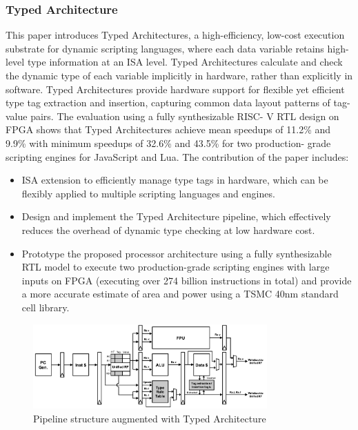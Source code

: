 \subsubsection{Typed Architecture}
This paper introduces Typed
Architectures\cite{TypedArchitecture}, a high-efficiency, low-cost execution substrate 
for dynamic scripting languages, where each data
variable retains high-level type information at an ISA level.
Typed Architectures calculate and check the dynamic type
of each variable implicitly in hardware, rather than explicitly
in software. Typed Architectures provide
hardware support for flexible yet efficient type tag extraction
and insertion, capturing common data layout patterns of tag-
value pairs. The evaluation using a fully synthesizable RISC-
V RTL design on FPGA shows that Typed Architectures
achieve mean speedups of 11.2\% and 9.9\% with
minimum speedups of 32.6\% and 43.5\% for two production-
grade scripting engines for JavaScript and Lua. 
The contribution of the paper includes:
\begin{itemize}
  \item ISA extension to efficiently manage
type tags in hardware, which can be flexibly applied to
multiple scripting languages and engines.
  \item Design and implement the Typed Architecture pipeline,
which effectively reduces the overhead of dynamic type
checking at low hardware cost.
  \item Prototype the proposed processor architecture using 
a fully synthesizable RTL model to execute two
production-grade scripting engines with large inputs on
FPGA (executing over 274 billion instructions in total)
and provide a more accurate estimate of area and power
using a TSMC 40nm standard cell library.
\end{itemize}

\begin{figure}[htbp!] 
  \centering    
  \includegraphics[width=0.8\textwidth]{TypedArchitecture}
  \caption[TypedArchitecture]{Pipeline structure augmented with Typed Architecture \cite{TypedArchitecture}}
  \label{fig:TypedArchitecture}
  \end{figure}


